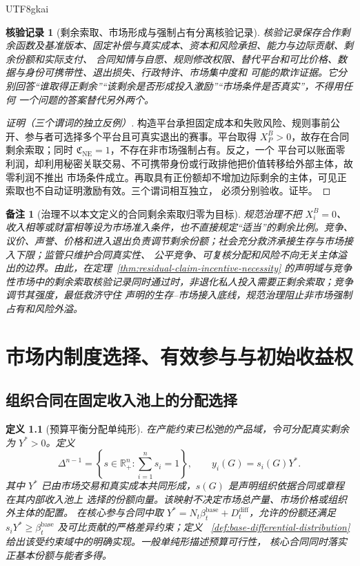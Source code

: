 \documentclass[12pt,a4paper,openany]{report}
\newtheorem{definition}{定义}[chapter]
\newtheorem{remark}{备注}[chapter]
\newtheorem{Certificate}{核验记录}[chapter]
\newcommand{\RR}{\mathbb R}
\newcommand{\DeltaN}{\Delta^{n-1}}
\begin{document}
\begin{CJK*}{UTF8}{gkai}
\begin{Certificate}[剩余索取、市场形成与强制占有分离核验记录]
核验记录保存合作剩余函数及基准版本、固定补偿与真实成本、资本和风险承担、能力与边际贡献、剩余份额和实际支付、
合同知情与自愿、规则修改权限、替代平台和可比价格、数据与身份可携带性、退出损失、行政特许、市场集中度和
可能的欺诈证据。它分别回答“谁取得正剩余”“该剩余是否形成投入激励”“市场条件是否真实”，不得用任何
一个问题的答案替代另外两个。
\end{Certificate}

\begin{proof}[证明（三个谓词的独立反例）]
构造平台承担固定成本和失败风险、规则事前公开、参与者可选择多个平台且可真实退出的赛事。平台取得
\(X_P^B>0\)，故存在合同剩余索取；同时 \(\mathfrak C_{\mathrm{NE}}=1\)，不存在非市场强制占有。反之，一个
平台可以账面零利润，却利用秘密关联交易、不可携带身份或行政排他把价值转移给外部主体，故零利润不推出
市场条件成立。再取具有正份额却不增加边际剩余的主体，可见正索取也不自动证明激励有效。三个谓词相互独立，
必须分别验收。证毕。
\end{proof}

\begin{remark}[治理不以本文定义的合同剩余索取归零为目标]
规范治理不把 \(X_i^B=0\)、收入相等或财富相等设为市场准入条件，也不直接规定“适当”的剩余比例。竞争、
议价、声誉、价格和进入退出负责调节剩余份额；社会充分救济承接生存与市场接入下限；监管只维护合同真实性、
公平竞争、可复核分配和风险不向无关主体溢出的边界。由此，在定理~\ref{thm:residual-claim-incentive-necessity}
的声明域与竞争性市场中的剩余索取核验记录同时通过时，非退化私人投入需要正剩余索取；竞争调节其强度，最低救济守住
声明的生存--市场接入底线，规范治理阻止非市场强制占有和风险外溢。
\end{remark}

\chapter{市场内制度选择、有效参与与初始收益权}
\label{chap:governance-participation}

\section{组织合同在固定收入池上的分配选择}

\begin{definition}[预算平衡分配单纯形]
在产能约束已松弛的产品域，令可分配真实剩余为 \(Y^*>0\)。定义
\[
  \DeltaN=\left\{s\in\RR_+^n:\sum_{i=1}^n s_i=1\right\},
\qquad
  y_i(G)=s_i(G)Y^*.
\]
其中 \(Y^*\) 已由市场交易和真实成本共同形成，\(s(G)\) 是声明组织依据合同或章程在其内部收入池上
选择的份额向量。该映射不决定市场总产量、市场价格或组织外主体的配置。
在核心参与合同中取 \(Y^*=N_t\beta_t^{\mathrm{base}}+D_t^{\mathrm{diff}}\)，允许的份额还满足
\(s_iY^*\ge\beta_t^{\mathrm{base}}\) 及可比贡献的严格差异约束；定义
~\ref{def:base-differential-distribution} 给出该受约束域中的明确实现。一般单纯形描述预算可行性，
核心合同同时落实正基本份额与能者多得。
\end{definition}


\end{CJK*}
\end{document}
